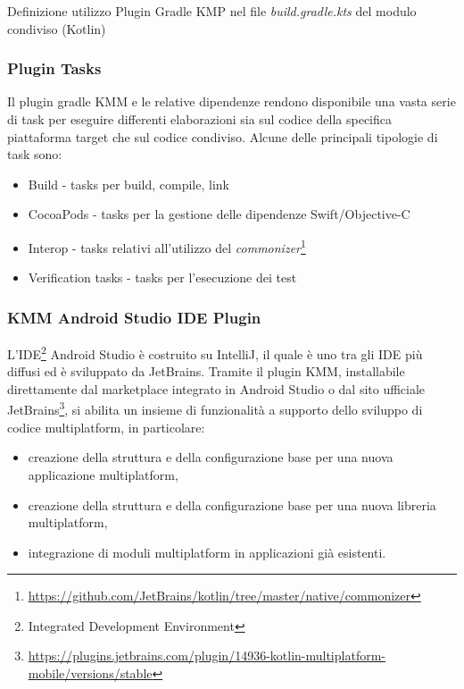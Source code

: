 \begin{listing}[H]
\inputminted{kotlin}{code/3-gradlekmm2}
\caption{Definizione utilizzo Plugin Gradle KMP nel file \textit{build.gradle.kts} del modulo condiviso (Kotlin)}
\end{listing}

\subsubsection{Plugin Tasks}
Il plugin gradle KMM e le relative dipendenze rendono disponibile una vasta serie di task per eseguire differenti elaborazioni sia sul codice della specifica piattaforma target che sul codice condiviso. Alcune delle principali tipologie di task sono:
\begin{itemize}
    \item Build - tasks per build, compile, link
    \item CocoaPods - tasks per la gestione delle dipendenze Swift/Objective-C
    \item Interop - tasks relativi all'utilizzo del \textit{commonizer}\footnote{\url{https://github.com/JetBrains/kotlin/tree/master/native/commonizer}}
    \item Verification tasks - tasks per l'esecuzione dei test
\end{itemize}

\subsubsection{KMM Android Studio IDE Plugin}
L'IDE\footnote{Integrated Development Environment} Android Studio è costruito su IntelliJ, il quale è uno tra gli IDE più diffusi ed è sviluppato da JetBrains. Tramite il plugin KMM, installabile direttamente dal marketplace integrato in Android Studio o dal sito ufficiale JetBrains\footnote{\url{https://plugins.jetbrains.com/plugin/14936-kotlin-multiplatform-mobile/versions/stable}}, si abilita un insieme di funzionalità a supporto dello sviluppo di codice multiplatform, in particolare:
\begin{itemize}
    \item creazione della struttura e della configurazione base per una nuova applicazione multiplatform,
    \item creazione della struttura e della configurazione base per una nuova libreria multiplatform,
    \item integrazione di moduli multiplatform in applicazioni già esistenti.
\end{itemize}

